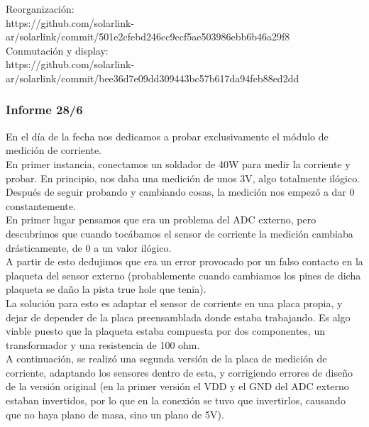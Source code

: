 Reorganización:\\
https://github.com/solarlink-\\ar/solarlink/commit/501e2cfebd246cc9ccf5ae503986ebb6b46a29f8\\

Conmutación y display:\\
https://github.com/solarlink-\\ar/solarlink/commit/bee36d7e09dd309443bc57b617da94feb88ed2dd\\

\subsubsection{Informe 28/6}

En el día de la fecha nos dedicamos a probar exclusivamente el módulo de medición de corriente.\\

En primer instancia, conectamos un soldador de 40W para medir la corriente y probar. En principio, nos daba una medición de unos 3V, algo totalmente ilógico. Después de seguir probando y cambiando cosas, la medición nos empezó a dar 0 constantemente.\\

En primer lugar pensamos que era un problema del ADC externo, pero descubrimos que cuando tocábamos el sensor de corriente la medición cambiaba drásticamente, de 0 a un valor ilógico. \\

A partir de esto dedujimos que era un error provocado por un falso contacto en la plaqueta del sensor externo (probablemente cuando cambiamos los pines de dicha plaqueta se daño la pista true hole que tenia).\\

La solución para esto es adaptar el sensor de corriente en una placa propia, y dejar de depender de la placa preensamblada donde estaba trabajando. Es algo viable puesto que la plaqueta estaba compuesta por dos componentes, un transformador y una resistencia de 100 ohm.\\

A continuación, se realizó una segunda versión de la placa de medición de corriente, adaptando los sensores dentro de esta, y corrigiendo errores de diseño de la versión original (en la primer versión el VDD y el GND del ADC externo estaban invertidos, por lo que en la conexión se tuvo que invertirlos, causando que no haya plano de masa, sino un plano de 5V).\\


